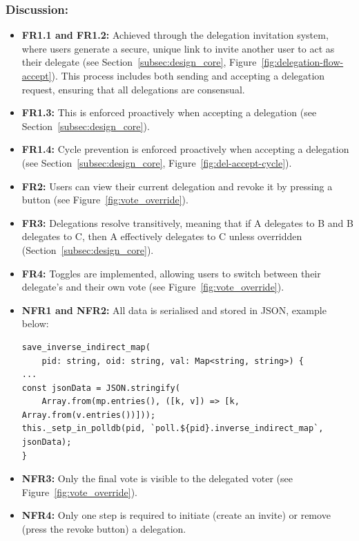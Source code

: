\subsubsection{Discussion:}

\begin{itemize}
    \item \textbf{FR1.1 and FR1.2:} Achieved through the delegation invitation system, where users generate a secure, unique link to invite another user to act as their delegate (see Section~\ref{subsec:design_core}, Figure~\ref{fig:delegation-flow-accept}). This process includes both sending and accepting a delegation request, ensuring that all delegations are consensual.
    \item \textbf{FR1.3:} This is enforced proactively when accepting a delegation (see Section~\ref{subsec:design_core}).
    \item \textbf{FR1.4:} Cycle prevention is enforced proactively when accepting a delegation (see Section~\ref{subsec:design_core}, Figure~\ref{fig:del-accept-cycle}).
    \item \textbf{FR2:} Users can view their current delegation and revoke it by pressing a button (see Figure~\ref{fig:vote_override}).
    \item \textbf{FR3:} Delegations resolve transitively, meaning that if A delegates to B and B delegates to C, then A effectively delegates to C unless overridden (Section~\ref{subsec:design_core}).
    \item \textbf{FR4:} Toggles are implemented, allowing users to switch between their delegate's and their own vote (see Figure~\ref{fig:vote_override}).
    \item \textbf{NFR1 and NFR2:} All data is serialised and stored in JSON, example below:
\begin{verbatim}
save_inverse_indirect_map(
    pid: string, oid: string, val: Map<string, string>) {
...
const jsonData = JSON.stringify(
    Array.from(mp.entries(), ([k, v]) => [k, Array.from(v.entries())]));
this._setp_in_polldb(pid, `poll.${pid}.inverse_indirect_map`, jsonData);
}
\end{verbatim}
    \item \textbf{NFR3:} Only the final vote is visible to the delegated voter (see Figure~\ref{fig:vote_override}).
    \item \textbf{NFR4:} Only one step is required to initiate (create an invite) or remove (press the revoke button) a delegation.
\end{itemize}

